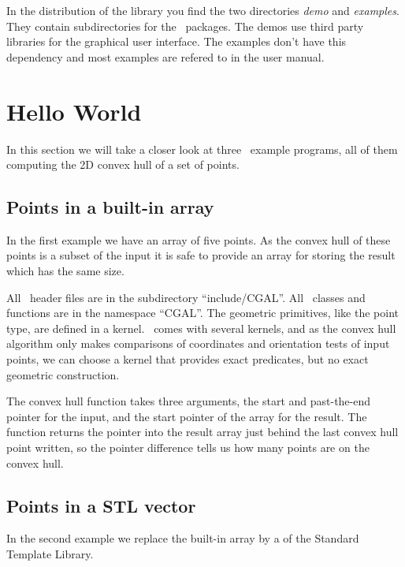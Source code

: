 In the distribution of the library  you find the two directories {\em demo}
and {\em examples}. They contain subdirectories for the \cgal\ packages.  
The demos use third party libraries for the graphical user interface. The 
examples don't have this dependency and most examples are refered to in the 
user manual.



\section{Hello World}

In this section we will take a closer look at three \cgal\ example
programs, all of them computing the 2D convex hull of a set of points.


\subsection{Points in a built-in array}

In the first example we have an array of five points.
As the convex hull of these points is a subset of the input
it is safe to provide an array for storing the result which
has the same size.



All \cgal\ header files are in the subdirectory ``include/CGAL''.  All \cgal\ 
classes and functions are in the namespace ``CGAL''.  The geometric
primitives, like the point type, are defined in a kernel. \cgal\ comes
with several kernels, and as the convex hull algorithm only makes
comparisons of coordinates and orientation tests of input points,
we can choose a kernel that provides exact predicates, but no 
exact geometric construction.

The convex hull function takes three arguments, the start
and past-the-end pointer for the input, and the start pointer of the 
array for the result. The function returns the pointer
into the result array just behind the last convex hull
point written, so the pointer difference tells us how
many points are on the convex hull. 
 

\subsection{Points in a STL vector}

In the second example we replace the built-in array
by a  of the Standard Template Library.

